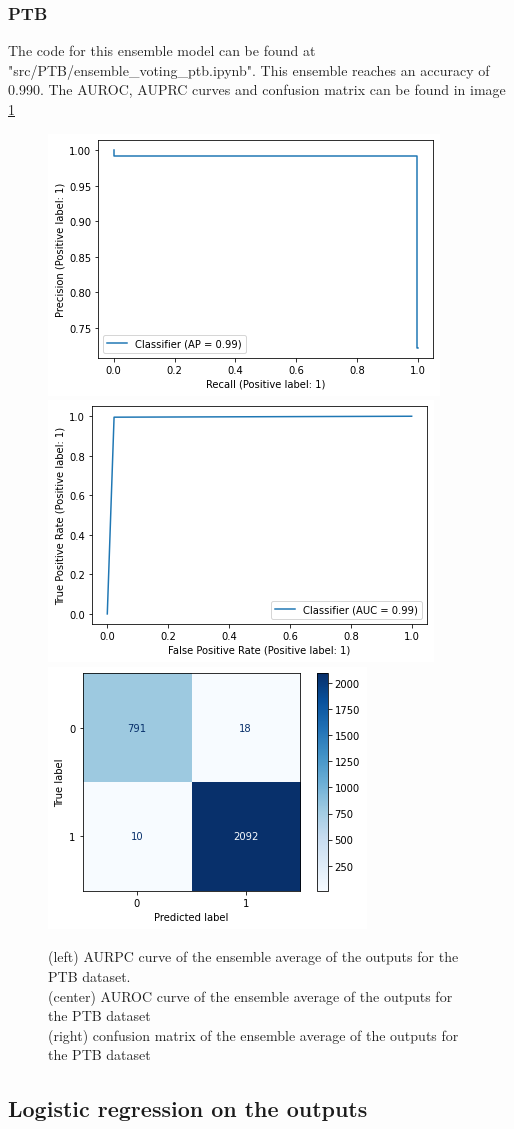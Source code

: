 \documentclass[11pt]{scrartcl}
\begin{document}
\subsubsection{PTB}
The code for this ensemble model can be found at "src/PTB/ensemble\_voting\_ptb.ipynb".
This ensemble reaches an accuracy of 0.990. The AUROC, AUPRC curves and confusion matrix can be found in image \ref{fig:ensemble_voting_ptb_three}
\begin{figure}[htp]
\centering
\includegraphics[width=.30\textwidth]{../models_performance_graphs/ptb/ensemble_voting_AURPC_ptb.png}\hfill
\includegraphics[width=.30\textwidth]{../models_performance_graphs/ptb/ensemble_voting_AUROC_ptb.png}\hfill
\includegraphics[width=.30\textwidth]{../models_performance_graphs/ptb/ensemble_voting_confusion_ptb.png}
\caption{(left) AURPC curve of the ensemble average of the outputs for the PTB dataset. \\ (center) AUROC curve of the ensemble average of the outputs for the PTB dataset \\ (right) confusion matrix of the ensemble average of the outputs for the PTB dataset}
\label{fig:ensemble_voting_ptb_three}
\end{figure}

\subsection{Logistic regression on the outputs}
\end{document}
